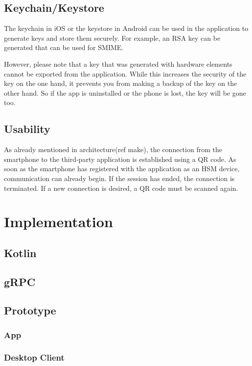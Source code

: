 \documentclass[12pt,oneside,a4paper,parskip]{scrbook}
\begin{document}
\section{Keychain/Keystore}
The keychain in iOS or the keystore in Android can be used in the application to generate keys and store them securely. For example, an RSA key can be generated that can be used for SMIME. 

However, please note that a key that was generated with hardware elements cannot be exported from the application. While this increases the security of the key on the one hand, it prevents you from making a backup of the key on the other hand. So if the app is uninstalled or the phone is lost, the key will be gone too. 
\section{Usability}
As already mentioned in architecture(ref make), the connection from the smartphone to the third-party application is established using a QR code. As soon as the smartphone has registered with the application as an HSM device, communication can already begin. If the session has ended, the connection is terminated. If a new connection is desired, a QR code must be scanned again.

\chapter{Implementation}

\section{Kotlin}

\section{gRPC}

\section{Prototype}

\subsection{App}

\subsection{Desktop Client}
\end{document}
